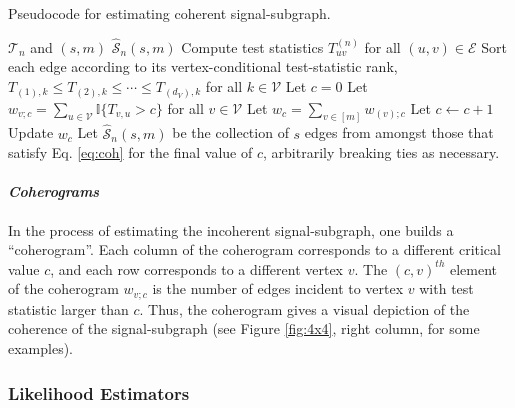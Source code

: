 \documentclass[10pt,journal,cspaper,compsoc]{IEEEtran}
\newcommand{\II}{\mathbb{I}}           %
\providecommand{\mc}[1]{\mathcal{#1}}
\providecommand{\mhc}[1]{\widehat{\mathcal{#1}}}
\begin{document}
\begin{algorithm}
\caption{Pseudocode for estimating coherent signal-subgraph.}
\label{alg:coh}
\begin{algorithmic}[1]
\REQUIRE $\mc{T}_n$ and $(s,m)$
\ENSURE $\mhc{S}_n(s,m)$
\STATE Compute test statistics $T_{uv}^{(n)}$ for all $(u,v) \in \mc{E}$
\STATE Sort each edge according to its vertex-conditional test-statistic rank, $T_{(1),k} \leq T_{(2),k} \leq \cdots \leq T_{(d_V),k}$ for all $k \in \mc{V}$
\STATE Let $c=0$
\STATE Let $w_{v;c}=\sum_{u \in \mc{V}} \II\{T_{v,u}>c\}$ for all $v \in \mc{V}$ 
\STATE Let $w_c=\sum_{v \in [m]} w_{(v);c}$
\STATE Let $c \leftarrow c+ 1$
\STATE Update $w_c$ 
\ENDWHILE
\STATE Let $\mhc{S}_n(s,m)$ be the collection of $s$ edges from amongst those that satisfy Eq. \ref{eq:coh} for the final value of $c$, arbitrarily breaking ties as necessary.
\end{algorithmic}
\end{algorithm}

\paragraph{\emph{Coherograms}}

In the process of estimating the incoherent signal-subgraph, one builds a ``coherogram''.  Each column of the coherogram corresponds to a different critical value $c$, and each row corresponds to a different vertex $v$.  The $(c,v)^{th}$ element of the coherogram $w_{v;c}$ is the number of edges incident to vertex $v$ with test statistic larger than $c$.  Thus, the coherogram gives a visual depiction of the coherence of the signal-subgraph (see Figure \ref{fig:4x4}, right column, for some examples).


\subsubsection{Likelihood Estimators} %
\label{sub:likelihood}
\end{document}
